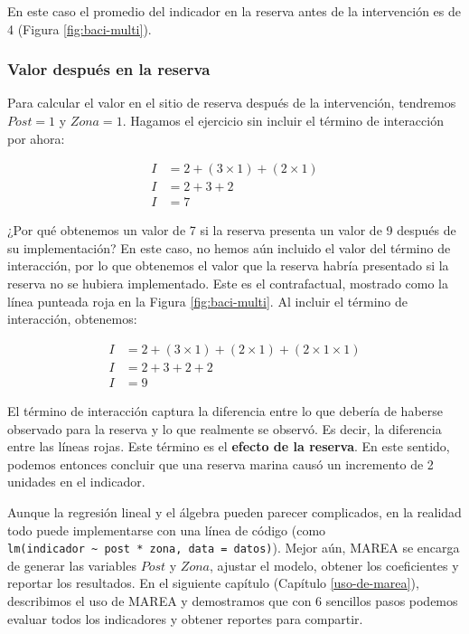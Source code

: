 \documentclass[]{krantz}
\begin{document}
En este caso el promedio del indicador en la reserva antes de la intervención es de 4 (Figura \ref{fig:baci-multi}).

\hypertarget{valor-despues-en-la-reserva}{%
\subsubsection{Valor después en la reserva}\label{valor-despues-en-la-reserva}}

Para calcular el valor en el sitio de reserva después de la intervención, tendremos \(Post = 1\) y \(Zona =1\). Hagamos el ejercicio sin incluir el término de interacción por ahora:

\[
\begin{split}
I &= 2 + (3 \times 1) + (2\times 1) \\
I &= 2 + 3 + 2 \\
I &= 7
\end{split}
\]

¿Por qué obtenemos un valor de 7 si la reserva presenta un valor de 9 después de su implementación? En este caso, no hemos aún incluido el valor del término de interacción, por lo que obtenemos el valor que la reserva habría presentado si la reserva no se hubiera implementado. Este es el contrafactual, mostrado como la línea punteada roja en la Figura \ref{fig:baci-multi}. Al incluir el término de interacción, obtenemos:

\[
\begin{split}
I &= 2 + (3 \times 1) + (2\times 1) + (2\times 1 \times 1)\\
I &= 2 + 3 + 2 + 2\\
I &= 9
\end{split}
\]

El término de interacción captura la diferencia entre lo que debería de haberse observado para la reserva y lo que realmente se observó. Es decir, la diferencia entre las líneas rojas. Este término es el \textbf{efecto de la reserva}. En este sentido, podemos entonces concluir que una reserva marina causó un incremento de 2 unidades en el indicador.

Aunque la regresión lineal y el álgebra pueden parecer complicados, en la realidad todo puede implementarse con una línea de código (como \texttt{lm(indicador\ \textasciitilde{}\ post\ *\ zona,\ data\ =\ datos)}). Mejor aún, MAREA se encarga de generar las variables \(Post\) y \(Zona\), ajustar el modelo, obtener los coeficientes y reportar los resultados. En el siguiente capítulo (Capítulo \ref{uso-de-marea}), describimos el uso de MAREA y demostramos que con 6 sencillos pasos podemos evaluar todos los indicadores y obtener reportes para compartir.
\end{document}

